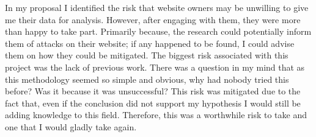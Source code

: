 In my proposal I identified the risk that website owners may be unwilling to give me their data for analysis. However, after engaging with them, they were more than happy to take part. Primarily because, the research could potentially inform them of attacks on their website; if any happened to be found, I could advise them on how they could be mitigated. The biggest risk associated with this project was the lack of previous work. There was a question in my mind that as this methodology seemed so simple and obvious, why had nobody tried this before? Was it because it was unsuccessful? This risk was mitigated due to the fact that, even if the conclusion did not support my hypothesis I would still be adding knowledge to this field. Therefore, this was a worthwhile risk to take and one that I would gladly take again.